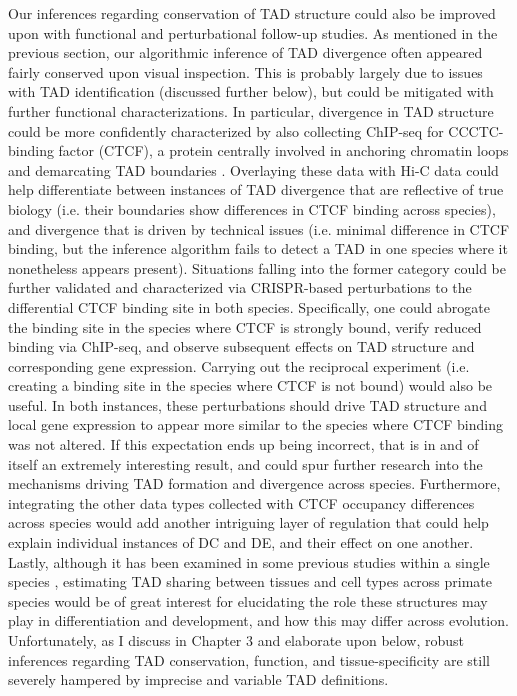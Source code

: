 Our inferences regarding conservation of TAD structure could also be improved upon with functional and perturbational follow-up studies. As mentioned in the previous section, our algorithmic inference of TAD divergence often appeared fairly conserved upon visual inspection. This is probably largely due to issues with TAD identification (discussed further below), but could be mitigated with further functional characterizations. In particular, divergence in TAD structure could be more confidently characterized by also collecting ChIP-seq for CCCTC-binding factor (CTCF), a protein centrally involved in anchoring chromatin loops and demarcating TAD boundaries \cite{Rao.2014, Zuin.2014, Phillips-Cremins.2013, Dixon.2012, Nora.2012}. Overlaying these data with Hi-C data could help differentiate between instances of TAD divergence that are reflective of true biology (i.e. their boundaries show differences in CTCF binding across species), and divergence that is driven by technical issues (i.e. minimal difference in CTCF binding, but the inference algorithm fails to detect a TAD in one species where it nonetheless appears present). Situations falling into the former category could be further validated and characterized via CRISPR-based perturbations to the differential CTCF binding site in both species. Specifically, one could abrogate the binding site in the species where CTCF is strongly bound, verify reduced binding via ChIP-seq, and observe subsequent effects on TAD structure and corresponding gene expression. Carrying out the reciprocal experiment (i.e. creating a binding site in the species where CTCF is not bound) would also be useful. In both instances, these perturbations should drive TAD structure and local gene expression to appear more similar to the species where CTCF binding was not altered. If this expectation ends up being incorrect, that is in and of itself an extremely interesting result, and could spur further research into the mechanisms driving TAD formation and divergence across species. Furthermore, integrating the other data types collected with CTCF occupancy differences across species would add another intriguing layer of regulation that could help explain individual instances of DC and DE, and their effect on one another. Lastly, although it has been examined in some previous studies within a single species \cite{Sauerwald.2019, Sauerwald.2018, Schmitt.2016, Dixon.2015}, estimating TAD sharing between tissues and cell types across primate species would be of great interest for elucidating the role these structures may play in differentiation and development, and how this may differ across evolution. Unfortunately, as I discuss in Chapter 3 and elaborate upon below, robust inferences regarding TAD conservation, function, and tissue-specificity are still severely hampered by imprecise and variable TAD definitions.


